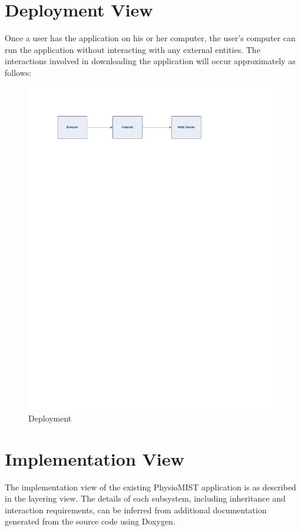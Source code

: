 \documentclass{article}
\begin{document}
\section{Deployment View}
Once a user has the application on his or her computer, the user's computer can run the application without interacting with any external entities.
The interactions involved in downloading the application will occur approximately as follows:
\begin{figure}[!htb]
\centering
\includegraphics[width=\textwidth]{./diagrams/deployment}
\caption{Deployment}
\end{figure} 

\section{Implementation View}
The implementation view of the existing PhysioMIST application is as described in the layering view. The details of each subsystem, including inheritance and interaction requirements, can be inferred from additional documentation generated from the source code using Doxygen.
\end{document}
